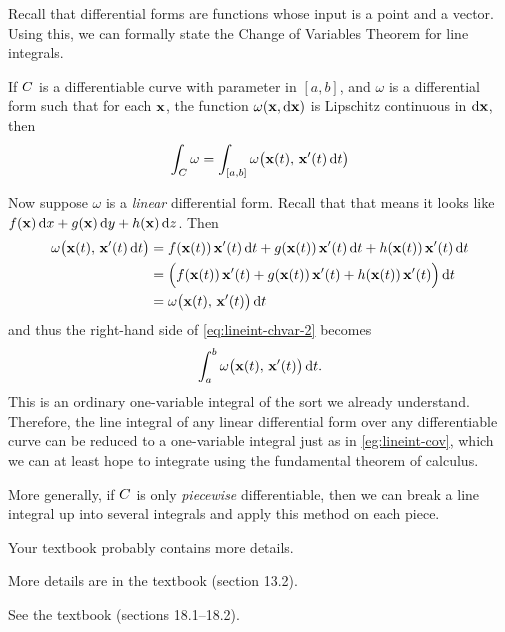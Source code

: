 \documentclass[12pt]{amsart}
\begin{document}
Recall that differential forms are functions whose input is a point and a vector.
Using this, we can formally state the Change of Variables Theorem for line integrals.

\begin{thm}
  If $\curve$ is a differentiable curve with parameter in $[a,b]$, and $\omega$ is a differential form such that for each $\ptx$, the function $\omega(\ptx,\dpx)$ is Lipschitz continuous in $\dpx$, then
  \begin{equation}
    \lint{\curve} \omega = \lint{[a,b]} \omega\big(\curvept(t),\, \curvept'(t) \,\dt\big)\label{eq:lineint-chvar-2}
  \end{equation}
\end{thm}

Now suppose $\omega$ is a \emph{linear} differential form.
Recall that that means it looks like $f(\ptx)\,\dx + g(\ptx)\,\dy + h(\ptx)\,\dz$.
Then
\begin{align*}
  \omega\big(\curvept(t),\, \curvept'(t) \,\dt\big) &=
  f(\curvept(t))\,\curvept'(t) \,\dt + g(\curvept(t))\,\curvept'(t) \,\dt + h(\curvept(t))\,\curvept'(t) \,\dt\\
  &= \Big(f(\curvept(t))\,\curvept'(t) + g(\curvept(t))\,\curvept'(t) + h(\curvept(t))\,\curvept'(t)\Big) \,\dt\\
  &= \omega\big(\curvept(t),\, \curvept'(t)\big)\,\dt
\end{align*}
and thus the right-hand side of \cref{eq:lineint-chvar-2} becomes
\[ \itint t a b {\omega\big(\curvept(t),\, \curvept'(t)\big)}. \]
This is an ordinary one-variable integral of the sort we already understand.
Therefore, the line integral of any linear differential form over any differentiable curve can be reduced to a one-variable integral just as in \cref{eg:lineint-cov}, which we can at least hope to integrate using the fundamental theorem of calculus.

More generally, if $\curve$ is only \emph{piecewise} differentiable, then we can break a line integral up into several integrals and apply this method on each piece.
\begin{notextbook}Your textbook probably contains more details.\end{notextbook}%
\begin{stewart}More details are in the textbook (section 13.2).\end{stewart}%
\begin{hugheshallett}See the textbook (sections 18.1--18.2).\end{hugheshallett}
\end{document}
